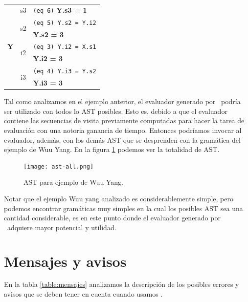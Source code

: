 \begin{center}
\begin{tabular}{|| c | c | l ||}
\multirow{7}{*}{\textbf{Y}} &                  s3 & \texttt{(eq 6)} \textbf{Y.s3 = 1} \\ \cline{2-3}
                           & \multirow{2}{*}{s2} &    \texttt{(eq 5) Y.s2 = Y.i2} \\
                           &                     & \textbf{Y.s2 = 3} \\ \cline{2-3}
                           & \multirow{2}{*}{i2} & \texttt{(eq 3) Y.i2 = X.s1} \\
                           &                     & \textbf{Y.i2 = 3} \\ \cline{2-3}
                           & \multirow{2}{*}{i3} & \texttt{(eq 4) Y.i3 = Y.s2} \\
                           &                     & \textbf{Y.i3 = 3} \\
\hline \hline
\end{tabular}\end{center}

Tal como analizamos en el ejemplo anterior, el evaluador generado por \maggen\ podría ser utilizado con todos lo AST posibles. Esto es, debido a que el evaluador contiene las secuencias de visita previamente computadas para hacer la tarea de evaluación con una notoria ganancia de tiempo. Entonces podríamos invocar al evaluador, además, con los demás AST que se desprenden con la gramática del ejemplo de Wuu Yang. En la figura \ref{fig:allast} podemos ver la totalidad de AST.

\begin{figure}[h!]\centering
\texttt{[image: ast-all.png]}
\caption{\label{fig:allast} AST para ejemplo de Wuu Yang.}
\end{figure}

Notar que el ejemplo Wuu yang analizado es considerablemente simple, pero podemos encontrar gramáticas muy simples en la cual los posibles AST sea una cantidad considerable, es en este punto donde el evaluador generado por \maggen\ adquiere mayor potencial y utilidad.

\section{Mensajes y avisos}

En la tabla \ref{table:mensajes} analizamos la descripción de los posibles errores y avisos que se deben tener en cuenta cuando usamos \maggen.
\newpage

